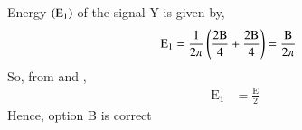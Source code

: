 \documentclass[beamer]{IEEEtran}
\theoremstyle{remark}
\begin{document}
Energy $\left(\text{E}_1\right)$ of the signal Y is given by,
\begin{align}
\label{2}
    \text{E}_1&=\frac{1}{2\pi}\left(\frac{2\text{B}}{4}+\frac{2\text{B}}{4}\right)=\frac{\text{B}}{2\pi}
\end{align}
So, from \brak{\ref{1}} and \brak{\ref{2}},
\begin{align}
    \text{E}_1&=\frac{\text{E}}{2}
\end{align}
Hence, option B is correct
\end{document}
